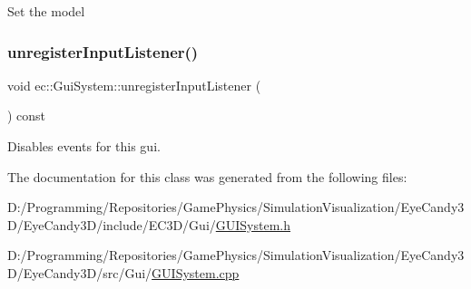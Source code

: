 Set the model \mbox{\label{classec_1_1_gui_system_a18d7d063334763b264da1392199f4c4e}} 
\subsubsection{\texorpdfstring{unregister\+Input\+Listener()}{unregisterInputListener()}}
{\footnotesize\ttfamily void ec\+::\+Gui\+System\+::unregister\+Input\+Listener (\begin{DoxyParamCaption}{ }\end{DoxyParamCaption}) const}

Disables events for this gui. 

The documentation for this class was generated from the following files\+:\begin{DoxyCompactItemize}
\item 
D\+:/\+Programming/\+Repositories/\+Game\+Physics/\+Simulation\+Visualization/\+Eye\+Candy3\+D/\+Eye\+Candy3\+D/include/\+E\+C3\+D/\+Gui/\mbox{\hyperlink{_g_u_i_system_8h}{G\+U\+I\+System.\+h}}\item 
D\+:/\+Programming/\+Repositories/\+Game\+Physics/\+Simulation\+Visualization/\+Eye\+Candy3\+D/\+Eye\+Candy3\+D/src/\+Gui/\mbox{\hyperlink{_g_u_i_system_8cpp}{G\+U\+I\+System.\+cpp}}\end{DoxyCompactItemize}

